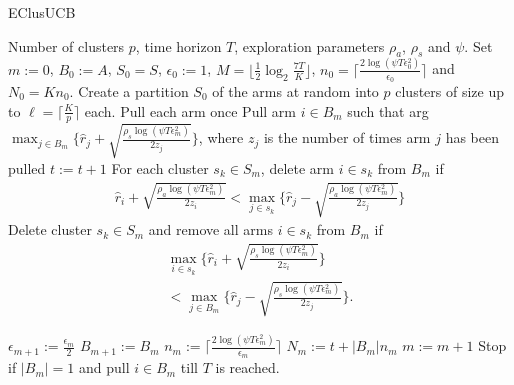 \begin{algorithm}[!h]
\caption{EClusUCB}
\label{alg:eclusucb}
\begin{algorithmic}
 Number of clusters $p$, time horizon $T$, exploration parameters $\rho_a$, $\rho_s$ and $\psi$.
 Set $m:=0$, $B_{0}:=A$, $S_0 = S$, $\epsilon_{0}:=1$, $M=\big \lfloor \frac{1}{2}\log_{2} \frac{7T}{K}\big\rfloor$, $n_{0}=\bigg\lceil\frac{2\log{(\psi T\epsilon_{0}^{2})}}{\epsilon_{0}}\bigg\rceil$ and  $N_{0}=Kn_{0}$.
\State Create a partition $S_0$ of the arms at random into $p$ clusters of size up to $\ell=\bigg\lceil \frac{K}{p} \bigg\rceil$ each.
\State Pull each arm once
\State Pull arm $i\in B_m$ such that arg$\max_{j\in B_{m}}\bigg\lbrace \hat{r}_{j} + \sqrt{\frac{\rho_{s}\log{(\psi T\epsilon_{m}^{2})}}{2 z_{j}}} \bigg\rbrace$, where $z_j$ is the number of times arm $j$ has been pulled
\State $t:=t+1$
\ArmElim
\State For each cluster $s_k \in S_{m}$, delete arm ${i}\in s_{k}$ from $B_{m}$ if
\begin{align*}
\hat{r}_{i} + \sqrt{\frac{\rho_{a}\log{(\psi T\epsilon_{m}^{2})}}{2 z_{i}}}  < \max_{{j}\in s_{k}}\bigg\lbrace\hat{r}_{j} -\sqrt{\frac{\rho_{a}\log{(\psi T\epsilon_{m}^{2})}}{2 z_{j}}} \bigg\rbrace
\end{align*}
\EndArmElim
\ClusElim
\State Delete cluster $s_{k}\in S_{m}$ and remove all arms $i\in s_{k}$ from $B_{m}$ if 
\begin{align*}
 \max_{{i}\in s_{k}}\bigg\lbrace\hat{r}_{i} + \sqrt{\frac{\rho_{s}\log{(\psi T\epsilon_{m}^{2})}}{2 z_{i}}}\bigg\rbrace \\
 < \max_{{j}\in B_{m}} \bigg\lbrace\hat{r}_{j} - \sqrt{\frac{\rho_{s} \log{(\psi T\epsilon_{m}^{2})}}{2 z_{j}}}\bigg\rbrace.
\end{align*}
\EndClusElim

\ResParam
\State $\epsilon_{m+1}:=\frac{\epsilon_{m}}{2}$\vspace{0.5ex}
\State $B_{m+1}:=B_{m}$
\State $n_{m}:=\bigg\lceil\frac{2\log{(\psi T\epsilon_{m}^{2})}}{\epsilon_{m}}\bigg\rceil$
\State $N_{m}:=t+|B_{m}| n_{m}$
\State $m:=m+1$
\EndResParam
\State Stop if $|B_{m}|=1$ and pull ${i}\in B_{m}$ till $T$ is reached.
\EndIf
\EndFor
\end{algorithmic}
\end{algorithm}

